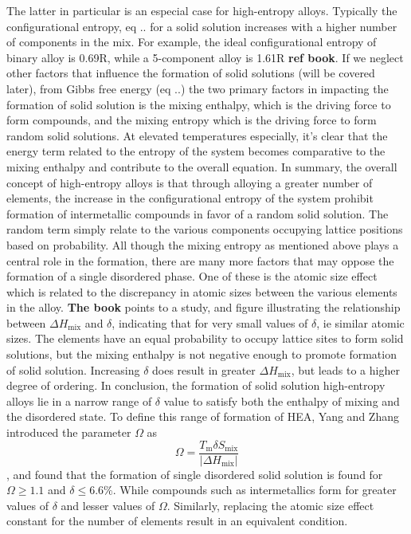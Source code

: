 The latter in particular is an especial case for high-entropy alloys. Typically the configurational entropy, eq .. for a solid solution increases with a higher number of components in the mix. For example, the ideal configurational entropy of binary alloy is 0.69R, while a 5-component alloy is 1.61R \textbf{ref book}. If we neglect other factors that influence the formation of solid solutions (will be covered later), from Gibbs free energy (eq ..) the two primary factors in impacting the formation of solid solution is the mixing enthalpy, which is the driving force to form compounds, and the mixing entropy which is the driving force to form random solid solutions. At elevated temperatures especially, it's clear that the energy term related to the entropy of the system becomes comparative to the mixing enthalpy and contribute to the overall equation. In summary, the overall concept of high-entropy alloys is that through alloying a greater number of elements, the increase in the configurational entropy of the system prohibit formation of intermetallic compounds in favor of a random solid solution. The random term simply relate to the various components occupying lattice positions based on probability. 
All though the mixing entropy as mentioned above plays a central role in the formation, there are many more factors that may oppose the formation of a single disordered phase. One of these is the atomic size effect which is related to the discrepancy in atomic sizes between the various elements in the alloy. \textbf{The book} points to a study, and figure illustrating the relationship between $\Delta H_\text{mix}$ and $\delta$, indicating that for very small values of $\delta$, ie similar atomic sizes. The elements have an equal probability to occupy lattice sites to form solid solutions, but the mixing enthalpy is not negative enough to promote formation of solid solution. Increasing $\delta$ does result in greater $\Delta H_\text{mix}$, but leads to a higher degree of ordering. In conclusion, the formation of solid solution high-entropy alloys lie in a narrow range of $\delta$ value to satisfy both the enthalpy of mixing and the disordered state. To define this range of formation of HEA, Yang and Zhang introduced the parameter $\Omega$ as
\begin{equation}
\Omega = \frac{T_\text{m} \delta S_\text{mix}}{|\Delta H_\text{mix}|}
\end{equation}
, and found that the formation of single disordered solid solution is found for $\Omega \geq 1.1$ and $\delta \leq 6.6\%$. While compounds such as intermetallics form for greater values of $\delta$ and lesser values of $\Omega$. Similarly, replacing the atomic size effect constant for the number of elements result in an equivalent condition.
